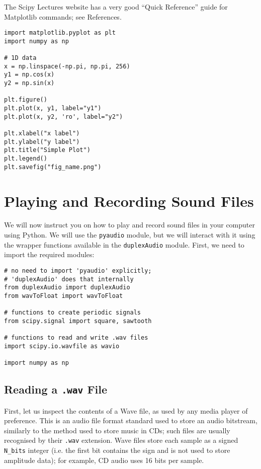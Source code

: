 The Scipy Lectures website has a very good ``Quick Reference'' guide for Matplotlib commands; see References.

\begin{lstlisting}[frame=single]
import matplotlib.pyplot as plt
import numpy as np

# 1D data
x = np.linspace(-np.pi, np.pi, 256)
y1 = np.cos(x)
y2 = np.sin(x)

plt.figure()
plt.plot(x, y1, label="y1")
plt.plot(x, y2, 'ro', label="y2")

plt.xlabel("x label")
plt.ylabel("y label")
plt.title("Simple Plot")
plt.legend()
plt.savefig("fig_name.png")

\end{lstlisting}


\section{Playing and Recording Sound Files}

We will now instruct you on how to play and record sound files in your computer using Python. We will use the {\tt pyaudio} module, but we will interact with it using the wrapper functions available in the {\tt duplexAudio} module. First, we need to import the required modules:

\begin{lstlisting}[frame=single]
# no need to import 'pyaudio' explicitly;
# 'duplexAudio' does that internally
from duplexAudio import duplexAudio
from wavToFloat import wavToFloat

# functions to create periodic signals
from scipy.signal import square, sawtooth

# functions to read and write .wav files
import scipy.io.wavfile as wavio

import numpy as np
\end{lstlisting}

\subsection{Reading a {\tt .wav} File}

First, let us inspect the contents of a Wave file, as used by any media player of preference. This is an audio file format standard used to store an audio bitstream, similarly to the method used to store music in CDs; such files are usually recognised by their {\tt .wav} extension. Wave files store each sample as a signed {\tt N\_bits} integer (i.e. the first bit contains the sign and is not used to store amplitude data); for example, CD audio uses 16 bits per sample.

